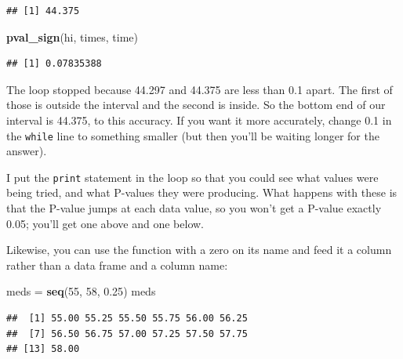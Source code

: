 \documentclass[]{tufte-book}
\newenvironment{Shaded}{}{}
\newcommand{\DecValTok}[1]{\textcolor[rgb]{0.25,0.63,0.44}{#1}}
\newcommand{\FloatTok}[1]{\textcolor[rgb]{0.25,0.63,0.44}{#1}}
\newcommand{\KeywordTok}[1]{\textcolor[rgb]{0.00,0.44,0.13}{\textbf{#1}}}
\newcommand{\NormalTok}[1]{#1}
\newcommand{\OperatorTok}[1]{\textcolor[rgb]{0.40,0.40,0.40}{#1}}
\newcommand{\StringTok}[1]{\textcolor[rgb]{0.25,0.44,0.63}{#1}}
\theoremstyle{definition}
\theoremstyle{definition}
\theoremstyle{definition}
\theoremstyle{remark}
\begin{document}
\begin{verbatim}
## [1] 44.375
\end{verbatim}

\begin{Shaded}
\begin{Highlighting}[]
\KeywordTok{pval_sign}\NormalTok{(hi, times, time)}
\end{Highlighting}
\end{Shaded}

\begin{verbatim}
## [1] 0.07835388
\end{verbatim}

The loop stopped because 44.297 and 44.375 are less than 0.1 apart. The
first of those is outside the interval and the second is inside. So the
bottom end of our interval is 44.375, to this accuracy. If you want it
more accurately, change 0.1 in the \texttt{while} line to something
smaller (but then you'll be waiting longer for the answer).

I put the \texttt{print} statement in the loop so that you could see
what values were being tried, and what P-values they were producing.
What happens with these is that the P-value jumps at each data value, so
you won't get a P-value exactly 0.05; you'll get one above and one
below.

Likewise, you can use the function with a zero on its name and feed it a
column rather than a data frame and a column name:

\begin{Shaded}
\begin{Highlighting}[]
\NormalTok{meds =}\StringTok{ }\KeywordTok{seq}\NormalTok{(}\DecValTok{55}\NormalTok{, }\DecValTok{58}\NormalTok{, }\FloatTok{0.25}\NormalTok{)}
\NormalTok{meds}
\end{Highlighting}
\end{Shaded}

\begin{verbatim}
##  [1] 55.00 55.25 55.50 55.75 56.00 56.25
##  [7] 56.50 56.75 57.00 57.25 57.50 57.75
## [13] 58.00
\end{verbatim}

\begin{Shaded}
\end{Shaded}
\end{document}
